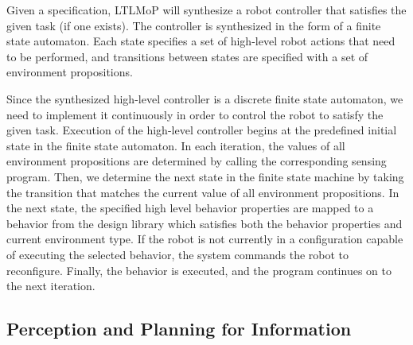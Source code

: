 \documentclass[conference]{IEEEtran}
\newcommand{\lt}{{\tt True }}
\begin{document}
Given a specification,  LTLMoP will synthesize a robot controller that satisfies the given  task (if one exists). The controller is synthesized in the form of a finite state automaton.
Each state specifies a set of high-level robot actions that need to be performed, and transitions between states are specified with a set of environment propositions.

Since the synthesized high-level controller is a discrete finite state automaton, we need to implement it continuously in order to control the robot to satisfy the given task.
Execution of the high-level controller begins at the predefined initial state in the finite state automaton. In each iteration, the values of all environment propositions are determined by calling the corresponding sensing program. Then, we determine the next state in the finite state machine by taking the transition that matches the current value of all environment propositions. 
In the next state, the specified high level behavior properties are mapped to a behavior from the design library which satisfies both the behavior properties and current environment type.
If the robot is not currently in a configuration capable of executing the selected behavior, the system commands the robot to reconfigure. Finally, the behavior is executed, and the program continues on to the next iteration. 


\subsection{Perception and Planning for Information}
\label{sec:exploration}
%
\end{document}
